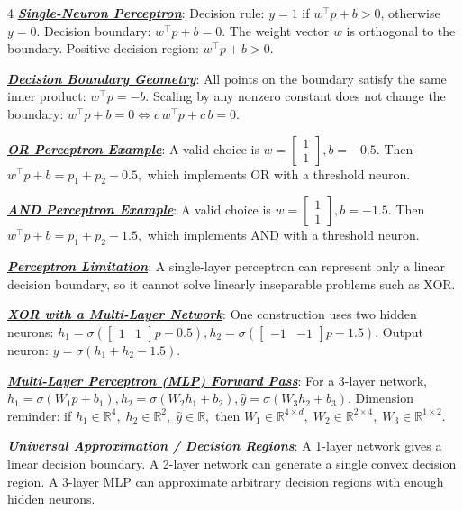 \documentclass[12pt]{article}
\newcommand{\bulletPoint}[1]{\underline{\textit{\textbf{#1}}}}
\begin{document}
\begin{multicols*}{4}
\bulletPoint{Single-Neuron Perceptron}:
Decision rule:
$y=1$ if $w^\top p+b>0$, otherwise $y=0.$
Decision boundary:
$w^\top p+b=0.$
The weight vector $w$ is orthogonal to the boundary.
Positive decision region:
$w^\top p+b>0.$

\bulletPoint{Decision Boundary Geometry}:
All points on the boundary satisfy the same inner product:
$w^\top p=-b.$
Scaling by any nonzero constant does not change the boundary:
$w^\top p+b=0 \iff c\,w^\top p+c\,b=0.$

\bulletPoint{OR Perceptron Example}:
A valid choice is
$w=\begin{bmatrix}1\\1\end{bmatrix}, b=-0.5.$
Then
$w^\top p+b=p_1+p_2-0.5,$
which implements OR with a threshold neuron.

\bulletPoint{AND Perceptron Example}:
A valid choice is
$w=\begin{bmatrix}1\\1\end{bmatrix}, b=-1.5.$
Then
$w^\top p+b=p_1+p_2-1.5,$
which implements AND with a threshold neuron.

\bulletPoint{Perceptron Limitation}:
A single-layer perceptron can represent only a linear decision boundary, so it cannot solve linearly inseparable problems such as XOR.

\bulletPoint{XOR with a Multi-Layer Network}:
One construction uses two hidden neurons:
$h_1=\sigma\!\left(\begin{bmatrix}1&1\end{bmatrix}p-0.5\right),
h_2=\sigma\!\left(\begin{bmatrix}-1&-1\end{bmatrix}p+1.5\right).$
Output neuron:
$y=\sigma(h_1+h_2-1.5).$

\bulletPoint{Multi-Layer Perceptron (MLP) Forward Pass}:
For a 3-layer network,
\textcolor{blue!50!black}{$\textstyle
h_1=\sigma(W_1p+b_1),
h_2=\sigma(W_2h_1+b_2),
\hat y=\sigma(W_3h_2+b_3).
$}
Dimension reminder:
if $h_1\in\mathbb R^4,\; h_2\in\mathbb R^2,\; \hat y\in\mathbb R,$ then
$W_1\in\mathbb R^{4\times d},\; W_2\in\mathbb R^{2\times 4},\; W_3\in\mathbb R^{1\times 2}.$



\bulletPoint{Universal Approximation / Decision Regions}:
A 1-layer network gives a linear decision boundary.
A 2-layer network can generate a single convex decision region.
A 3-layer MLP can approximate arbitrary decision regions with enough hidden neurons.


\end{multicols*}
\end{document}
